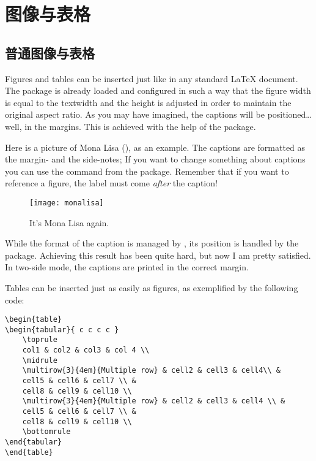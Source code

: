 \setchapterpreamble[u]{\margintoc}
\chapter{图像与表格}


\section{普通图像与表格}

Figures and tables can be inserted just like in any standard
\LaTeX\xspace document. The  package is already loaded
and configured in such a way that the figure width is equal to the
textwidth and the height is adjusted in order to maintain the original
aspect ratio. As you may have imagined, the captions will be
positioned\ldots well, in the margins. This is achieved with the help of
the  package.

Here is a picture of Mona Lisa (), as an example.
The captions are formatted as the margin- and the side-notes; If you
want to change something about captions you can use the command
 from the  package. Remember that if
you want to reference a figure, the label must come \emph{after} the
caption!

\begin{figure}[hb]
	\texttt{[image: monalisa]}
	\caption[Mona Lisa, again]{It's Mona Lisa again. \blindtext}
\end{figure}

While the format of the caption is managed by , its
position is handled by the  package. Achieving this
result has been quite hard, but now I am pretty satisfied. In two-side
mode, the captions are printed in the correct margin.

Tables can be inserted just as easily as figures, as exemplified by the
following code:

\begin{lstlisting}[caption={Caption of a listing.}]
\begin{table}
\begin{tabular}{ c c c c }
	\toprule
	col1 & col2 & col3 & col 4 \\
	\midrule
	\multirow{3}{4em}{Multiple row} & cell2 & cell3 & cell4\\ &
	cell5 & cell6 & cell7 \\ &
	cell8 & cell9 & cell10 \\
	\multirow{3}{4em}{Multiple row} & cell2 & cell3 & cell4 \\ &
	cell5 & cell6 & cell7 \\ &
	cell8 & cell9 & cell10 \\
	\bottomrule
\end{tabular}
\end{table}
\end{lstlisting}

